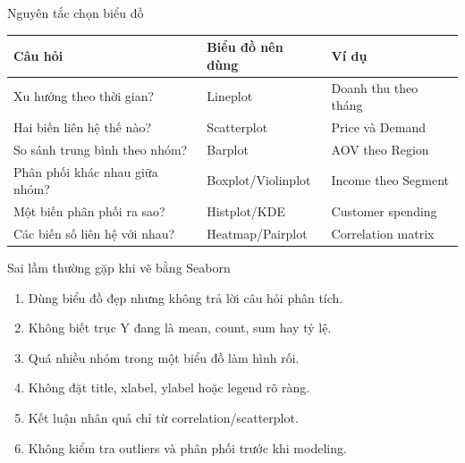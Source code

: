 \documentclass[aspectratio=169,11pt]{beamer}
\begin{document}
\begin{frame}{Nguyên tắc chọn biểu đồ}
\small
\begin{tabular}{p{}p{}p{}}
\toprule
\textbf{Câu hỏi} & \textbf{Biểu đồ nên dùng} & \textbf{Ví dụ} \\
\midrule
Xu hướng theo thời gian? & Lineplot & Doanh thu theo tháng \\
Hai biến liên hệ thế nào? & Scatterplot & Price và Demand \\
So sánh trung bình theo nhóm? & Barplot & AOV theo Region \\
Phân phối khác nhau giữa nhóm? & Boxplot/Violinplot & Income theo Segment \\
Một biến phân phối ra sao? & Histplot/KDE & Customer spending \\
Các biến số liên hệ với nhau? & Heatmap/Pairplot & Correlation matrix \\
\bottomrule
\end{tabular}
\end{frame}

\begin{frame}{Sai lầm thường gặp khi vẽ bằng Seaborn}
\begin{enumerate}
    \item Dùng biểu đồ đẹp nhưng không trả lời câu hỏi phân tích.
    \item Không biết trục Y đang là mean, count, sum hay tỷ lệ.
    \item Quá nhiều nhóm trong một biểu đồ làm hình rối.
    \item Không đặt title, xlabel, ylabel hoặc legend rõ ràng.
    \item Kết luận nhân quả chỉ từ correlation/scatterplot.
    \item Không kiểm tra outliers và phân phối trước khi modeling.
\end{enumerate}
\end{frame}
\end{document}
